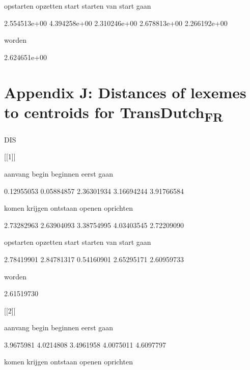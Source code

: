      opstarten       opzetten          start        starten van start gaan 



  2.554513e+00   4.394258e+00   2.310246e+00   2.678813e+00   2.266192e+00 



        worden 



  2.624651e+00 

\section{Appendix J: Distances of lexemes to centroids for TransDutch\textsubscript{FR}}

DIS



[[1]]



       aanvang          begin       beginnen          eerst           gaan 



    0.12955053     0.05884857     2.36301934     3.16694244     3.91766584 



         komen        krijgen       ontstaan         openen      oprichten 



    2.73282963     2.63904093     3.38754995     4.03403545     2.72209090 



     opstarten       opzetten          start        starten van start gaan 



    2.78419901     2.84781317     0.54160901     2.65295171     2.60959733 



        worden 



    2.61519730 



[[2]]



       aanvang          begin       beginnen          eerst           gaan 



     3.9675981      4.0214808      3.4961958      4.0075011      4.6097797 



         komen        krijgen       ontstaan         openen      oprichten 



